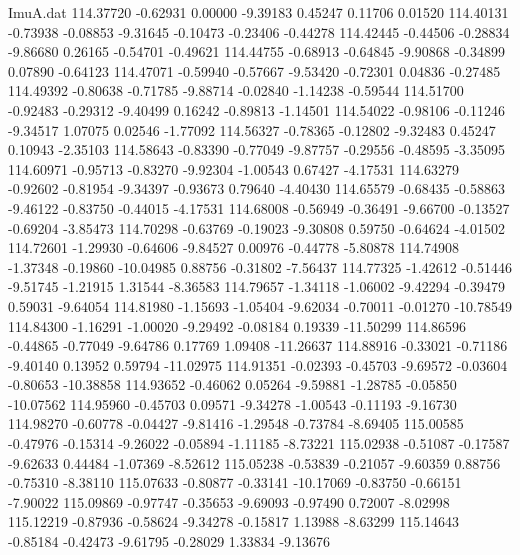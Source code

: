 \begin{filecontents}{ImuA.dat}
 114.37720   -0.62931    0.00000   -9.39183    0.45247    0.11706    0.01520
 114.40131   -0.73938   -0.08853   -9.31645   -0.10473   -0.23406   -0.44278
 114.42445   -0.44506   -0.28834   -9.86680    0.26165   -0.54701   -0.49621
 114.44755   -0.68913   -0.64845   -9.90868   -0.34899    0.07890   -0.64123
 114.47071   -0.59940   -0.57667   -9.53420   -0.72301    0.04836   -0.27485
 114.49392   -0.80638   -0.71785   -9.88714   -0.02840   -1.14238   -0.59544
 114.51700   -0.92483   -0.29312   -9.40499    0.16242   -0.89813   -1.14501
 114.54022   -0.98106   -0.11246   -9.34517    1.07075    0.02546   -1.77092
 114.56327   -0.78365   -0.12802   -9.32483    0.45247    0.10943   -2.35103
 114.58643   -0.83390   -0.77049   -9.87757   -0.29556   -0.48595   -3.35095
 114.60971   -0.95713   -0.83270   -9.92304   -1.00543    0.67427   -4.17531
 114.63279   -0.92602   -0.81954   -9.34397   -0.93673    0.79640   -4.40430
 114.65579   -0.68435   -0.58863   -9.46122   -0.83750   -0.44015   -4.17531
 114.68008   -0.56949   -0.36491   -9.66700   -0.13527   -0.69204   -3.85473
 114.70298   -0.63769   -0.19023   -9.30808    0.59750   -0.64624   -4.01502
 114.72601   -1.29930   -0.64606   -9.84527    0.00976   -0.44778   -5.80878
 114.74908   -1.37348   -0.19860  -10.04985    0.88756   -0.31802   -7.56437
 114.77325   -1.42612   -0.51446   -9.51745   -1.21915    1.31544   -8.36583
 114.79657   -1.34118   -1.06002   -9.42294   -0.39479    0.59031   -9.64054
 114.81980   -1.15693   -1.05404   -9.62034   -0.70011   -0.01270  -10.78549
 114.84300   -1.16291   -1.00020   -9.29492   -0.08184    0.19339  -11.50299
 114.86596   -0.44865   -0.77049   -9.64786    0.17769    1.09408  -11.26637
 114.88916   -0.33021   -0.71186   -9.40140    0.13952    0.59794  -11.02975
 114.91351   -0.02393   -0.45703   -9.69572   -0.03604   -0.80653  -10.38858
 114.93652   -0.46062    0.05264   -9.59881   -1.28785   -0.05850  -10.07562
 114.95960   -0.45703    0.09571   -9.34278   -1.00543   -0.11193   -9.16730
 114.98270   -0.60778   -0.04427   -9.81416   -1.29548   -0.73784   -8.69405
 115.00585   -0.47976   -0.15314   -9.26022   -0.05894   -1.11185   -8.73221
 115.02938   -0.51087   -0.17587   -9.62633    0.44484   -1.07369   -8.52612
 115.05238   -0.53839   -0.21057   -9.60359    0.88756   -0.75310   -8.38110
 115.07633   -0.80877   -0.33141  -10.17069   -0.83750   -0.66151   -7.90022
 115.09869   -0.97747   -0.35653   -9.69093   -0.97490    0.72007   -8.02998
 115.12219   -0.87936   -0.58624   -9.34278   -0.15817    1.13988   -8.63299
 115.14643   -0.85184   -0.42473   -9.61795   -0.28029    1.33834   -9.13676

\end{filecontents}
